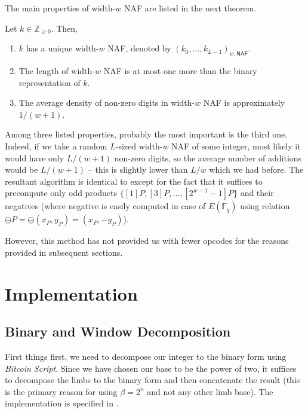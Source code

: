 \documentclass{iacrtrans}
\begin{document}
The main properties of width-$w$ NAF are listed in the next theorem.

\begin{theorem}
    Let $k \in \mathbb{Z}_{\geq 0}$. Then,
    \begin{enumerate}
        \item $k$ has a unique width-$w$ NAF, denoted by $(k_0,\dots,k_{L-1})_{w,\mathsf{NAF}}$.
        \item The length of width-$w$ NAF is at most one more than the binary representation of $k$.
        \item The average density of non-zero digits in width-$w$ NAF is approximately $1/(w+1)$.
    \end{enumerate}
\end{theorem}


Among three listed properties, probably the most important is the third one. Indeed, if we take a random $L$-sized width-$w$ NAF of some integer, most likely it would have only $L/(w+1)$ non-zero digits, so the average number of additions would be $L/(w+1)$ -- this is slightly lower than $L/w$ which we had before. The resultant algorithm is identical to  except for the fact that it suffices to precompute only odd products $\{[1]P,[3]P,\dots,[2^{w-1}-1]P\}$ and their negatives (where negative is easily computed in case of $E(\mathbb{F}_q)$ using relation $\ominus P = \ominus(x_P,y_P) = (x_P,-y_P)$). 

However, this method has not provided us with fewer opcodes for the reasons provided in subsequent sections.

\section{Implementation}

\subsection{Binary and Window Decomposition}

First things first, we need to decompose our integer to the binary form using \textit{Bitcoin Script}. Since we have chosen our base to be the power of two, it suffices to decompose the limbs to the binary form and then concatenate the result (this is the primary reason for using $\beta=2^n$ and not any other limb base). The implementation is specified in .
\end{document}
